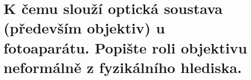 \section{K čemu slouží optická soustava (především objektiv) u fotoaparátu. Popište roli objektivu neformálně z 
fyzikálního hlediska.}